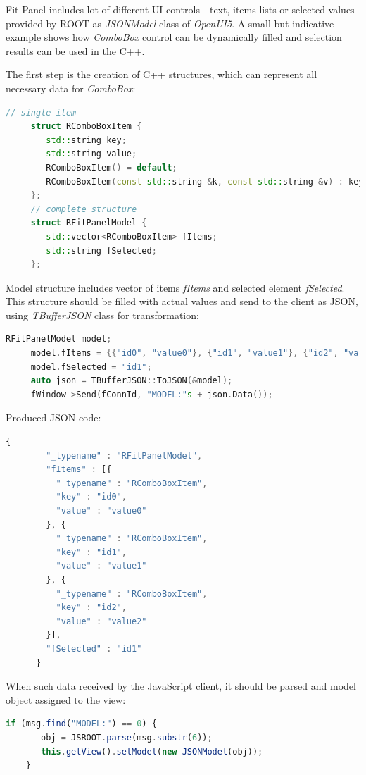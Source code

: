 \documentclass[a4paper]{jpconf}
\begin{document}
Fit Panel includes lot of different UI controls - text, items lists or selected values provided by ROOT as \textit{JSONModel} class of \textit{OpenUI5}. 
A small but indicative example shows how \textit{ComboBox} control can be dynamically filled and selection results can be used in the C++.

The first step is the creation of C++ structures, which can represent all necessary data for \textit{ComboBox}:

\begin{lstlisting}[language=C++,numbers=none]
     // single item
     struct RComboBoxItem {
        std::string key;
        std::string value;
        RComboBoxItem() = default;
        RComboBoxItem(const std::string &k, const std::string &v) : key(k), value(v) {}
     };
     // complete structure 
     struct RFitPanelModel {
        std::vector<RComboBoxItem> fItems;
        std::string fSelected;
     };
\end{lstlisting}

Model structure includes vector of items \textit{fItems} and selected element \textit{fSelected}.
This structure should be filled with actual values and send to the client as JSON, using \textit{TBufferJSON} class for transformation:

\begin{lstlisting}[language=C++,numbers=none]
     RFitPanelModel model;
     model.fItems = {{"id0", "value0"}, {"id1", "value1"}, {"id2", "value2"}};
     model.fSelected = "id1";
     auto json = TBufferJSON::ToJSON(&model);
     fWindow->Send(fConnId, "MODEL:"s + json.Data());
\end{lstlisting}

Produced JSON code:

\begin{lstlisting}[language=JavaScript,numbers=none]
      {
        "_typename" : "RFitPanelModel",
        "fItems" : [{
          "_typename" : "RComboBoxItem",
          "key" : "id0",
          "value" : "value0"
        }, {
          "_typename" : "RComboBoxItem",
          "key" : "id1",
          "value" : "value1"
        }, {
          "_typename" : "RComboBoxItem",
          "key" : "id2",
          "value" : "value2"
        }],
        "fSelected" : "id1"
      }
\end{lstlisting}

When such data received by the JavaScript client, it should be parsed and model object assigned to the view:

\begin{lstlisting}[language=JavaScript,numbers=none]
    if (msg.find("MODEL:") == 0) {
       obj = JSROOT.parse(msg.substr(6));
       this.getView().setModel(new JSONModel(obj));
    }
\end{lstlisting}
\end{document}
